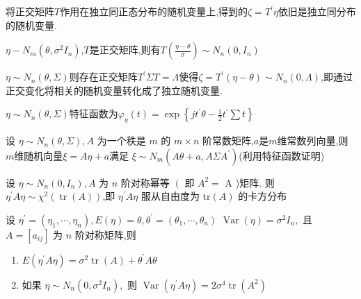 \documentclass[10pt]{yerbaformat}
\begin{document}
\begin{lemma}
    将正交矩阵$T$作用在独立同正态分布的随机变量上,得到的$\zeta=T^{\prime} \eta$依旧是独立同分布的随机变量.
\end{lemma}

\begin{proposition}
    $\eta-N_{m}\left(\theta, \sigma^{2} I_{n}\right)$,$T$是正交矩阵,则有$T\left(\frac{\eta-\theta}{\sigma}\right) \sim N_{n}\left(0, I_{n}\right)$
\end{proposition}

\begin{lemma}
    $\eta \sim N_{n}(\theta, \Sigma)$则存在正交矩阵$T^{\prime} \Sigma T=\Lambda$使得$\zeta=T^{\prime}(\eta-\theta)\sim N_{n}(0, \Lambda)$,即通过正交变化将相关的随机变量转化成了独立随机变量.
\end{lemma}

\begin{lemma}
    $\eta \sim N_{n}(\theta, \Sigma)$特征函数为$\varphi_{\eta}(t)=\exp \left\{j t^{\prime} \theta-\frac{1}{2} t^{\prime} \sum t\right\}$
\end{lemma}

\begin{lemma}
    设 $\eta \sim N_{n}(\theta, \Sigma), A$ 为一个秩是 $m$ 的 $m \times n$ 阶常数矩阵,$a$是$m$维常数列向量,则$m$维随机向量$\xi=A \eta+a$满足
    $\xi \sim N_{m}\left(A \theta+a, A \Sigma A^{\prime}\right)$(利用特征函数证明)
\end{lemma}

\begin{theorem}
    设 $\eta \sim N_{n}\left(0, I_{n}\right), A$ 为 $n$ 阶对称幂等 $\left(\right.$ 即 $A^{2}=$
        A )矩阵. 则$\eta^{\prime} A \eta \sim \chi^{2}(\operatorname{tr}(A))$,即 $\eta^{\prime} A \eta$ 服从自由度为 $\mathrm{tr}(A)$ 的卡方分布
\end{theorem}

\begin{theorem}
    设 $\eta^{\prime}=\left(\eta_{1}, \cdots, \eta_{n}\right), E(\eta)=\theta, \theta^{\prime}=\left(\theta_{1}, \cdots, \theta_{n}\right)$
    $\operatorname{Var}(\eta)=\sigma^{2} I_{n},$ 且 $A=\left[a_{i j}\right]$ 为 $n$ 阶对称矩阵,则
    \begin{enumerate}
        \item $E\left(\eta^{\prime} A \eta\right)=\sigma^{2} \operatorname{tr}(A)+\theta^{\prime} A \theta$
        \item 如果 $\eta \sim N_{n}\left(0, \sigma^{2} I_{n}\right),$ 则 $\operatorname{Var}\left(\eta^{\prime} A \eta\right)=2 \sigma^{4} \operatorname{tr}\left(A^{2}\right)$
    \end{enumerate}
\end{theorem}
\end{document}
